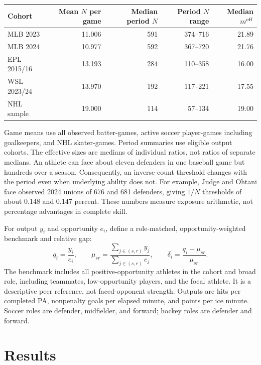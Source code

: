 \documentclass[11pt,letterpaper]{article}
\begin{document}
\begin{center}
\small
\begin{tabular}{@{}lrrrr@{}}
\toprule
Cohort & Mean $N$ per game & Median period $N$ & Period $N$ range & Median $m^{\rm eff}$ \\
\midrule
MLB 2023 & 11.006 & 591 & 374--716 & 21.89 \\
MLB 2024 & 10.977 & 592 & 367--720 & 21.76 \\
EPL 2015/16 & 13.193 & 284 & 110--358 & 16.00 \\
WSL 2023/24 & 13.970 & 192 & 117--221 & 17.55 \\
NHL sample & 19.000 & 114 & 57--134 & 19.00 \\
\bottomrule
\end{tabular}
\end{center}

Game means use all observed batter-games, active soccer player-games including goalkeepers, and NHL skater-games.
Period summaries use eligible output cohorts.
The effective sizes are medians of individual ratios, not ratios of separate medians.
An athlete can face about eleven defenders in one baseball game but hundreds over a season.
Consequently, an inverse-count threshold changes with the period even when underlying ability does not.
For example, Judge and Ohtani face observed 2024 unions of 676 and 681 defenders, giving $1/N$ thresholds of about 0.148 and 0.147 percent.
These numbers measure exposure arithmetic, not percentage advantages in complete skill.

For output $y_i$ and opportunity $e_i$, define a role-matched, opportunity-weighted benchmark and relative gap:
\begin{equation}
q_i=\frac{y_i}{e_i},\qquad
\mu_{sr}=\frac{\sum_{j\in(s,r)}y_j}{\sum_{j\in(s,r)}e_j},\qquad
\delta_i=\frac{q_i-\mu_{sr}}{\mu_{sr}}.
\label{eq:gap}
\end{equation}
The benchmark includes all positive-opportunity athletes in the cohort and broad role, including teammates, low-opportunity players, and the focal athlete.
It is a descriptive peer reference, not faced-opponent strength.
Outputs are hits per completed PA, nonpenalty goals per elapsed minute, and points per ice minute.
Soccer roles are defender, midfielder, and forward; hockey roles are defender and forward.

\section{Results}
\end{document}
